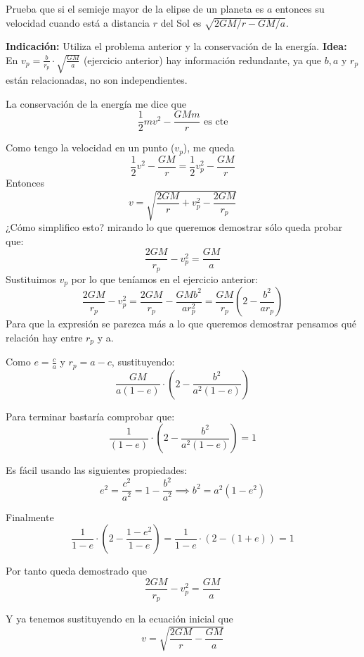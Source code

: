 \begin{problem}[6]
Prueba que si el semieje mayor de la elipse de un planeta es $a$ entonces su velocidad cuando está a distancia $r$ del Sol es $\sqrt{2GM/r-GM/a}$.

\textbf{Indicación:} Utiliza el problema anterior y la conservación de la energía.
\solution
\textbf{Idea:} En $v_p = \frac{b}{r_p}\cdot \sqrt{\frac{GM}{a}}$ (ejercicio anterior) hay información redundante, ya que $b,a\text{ y } r_p$ están relacionadas, no son independientes.

La conservación de la energía me dice que
$$\frac{1}{2}m v^2 - \frac{GMm}{r} \text{ es cte}$$

Como tengo la velocidad en un punto ($v_p$), me queda
$$\frac{1}{2} v^2 - \frac{GM}{r} = \frac{1}{2} v_p^2 - \frac{GM}{r}$$
Entonces
$$v = \sqrt{\frac{2GM}{r} + v_p^2 - \frac{2GM}{r_p}}$$
¿Cómo simplifico esto? mirando lo que queremos demostrar sólo queda probar que:
$$\frac{2GM}{r_p} - v_p^2 = \frac{GM}{a}$$
Sustituimos $v_p$ por lo que teníamos en el ejercicio anterior:
$$\frac{2GM}{r_p} - v_p^2 =\frac{2GM}{r_p} -\frac{GMb^2}{ar_p^2} = \frac{GM}{r_p}\left(2-\frac{b^2}{a r_p}\right) $$
Para que la expresión se parezca más a lo que queremos demostrar pensamos qué relación hay entre $r_p$ y a.


Como $e = \frac{c}{a}$ y $r_p = a-c$, sustituyendo:$$\frac{GM}{a(1-e)} \cdot \left(2-\frac{b^2}{a^2(1 - e)}\right)$$

Para terminar bastaría comprobar que:
$$\frac{1}{(1-e)} \cdot (2- \frac{b^2}{a^2(1-e)}) = 1$$

Es fácil usando las siguientes propiedades:
$$e^2 = \frac{c^2}{a^2} = 1-\frac{b^2}{a^2} \implies b^2 = a^2(1-e^2)$$

Finalmente
$$\frac{1}{1-e} \cdot \left(2 - \frac{1 - e^2}{1 - e}\right) = \frac{1}{1-e} \cdot (2-(1 + e)) = 1$$

Por tanto queda demostrado que
$$\frac{2GM}{r_p} - v_p^2 = \frac{GM}{a}$$

Y ya tenemos sustituyendo en la ecuación inicial que
\[v=\sqrt{\frac{2GM}{r}- \frac{GM}{a}}\]
\end{problem}

